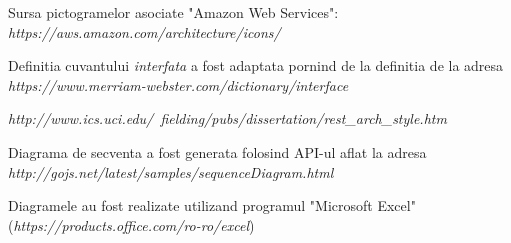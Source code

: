 \begin{thebibliography}{99}
Sursa pictogramelor asociate "Amazon Web Services": \emph{https://aws.amazon.com/architecture/icons/}

Definitia cuvantului \textit{interfata} a fost adaptata pornind de la definitia de la adresa \emph{https://www.merriam-webster.com/dictionary/interface}

\emph{http://www.ics.uci.edu/~fielding/pubs/dissertation/rest\_arch\_style.htm}

Diagrama de secventa a fost generata folosind API-ul aflat la adresa \emph{http://gojs.net/latest/samples/sequenceDiagram.html}

Diagramele au fost realizate utilizand programul "Microsoft Excel" (\emph{https://products.office.com/ro-ro/excel})

\end{thebibliography}